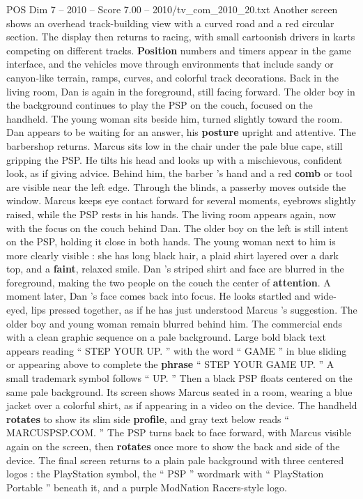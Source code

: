 \begin{textsample}{POS Dim 7 – 2010 – Score 7.00 – 2010/tv\_com\_2010\_20.txt}
Another screen shows an overhead track-building view with a curved road and a red circular section.
The display then returns to racing, with small cartoonish drivers in karts competing on different tracks. \textbf{Position} numbers and timers appear in the game interface, and the vehicles move through environments that include sandy or canyon-like terrain, ramps, curves, and colorful track decorations.
Back in the living room, Dan is again in the foreground, still facing forward.
The older boy in the background continues to play the PSP on the couch, focused on the handheld.
The young woman sits beside him, turned slightly toward the room.
Dan appears to be waiting for an answer, his \textbf{posture} upright and attentive.
The barbershop returns.
Marcus sits low in the chair under the pale blue cape, still gripping the PSP.
He tilts his head and looks up with a mischievous, confident look, as if giving advice.
Behind him, the barber ’s hand and a red \textbf{comb} or tool are visible near the left edge.
Through the blinds, a passerby moves outside the window.
Marcus keeps eye contact forward for several moments, eyebrows slightly raised, while the PSP rests in his hands.
The living room appears again, now with the focus on the couch behind Dan.
The older boy on the left is still intent on the PSP, holding it close in both hands.
The young woman next to him is more clearly visible : she has long black hair, a plaid shirt layered over a dark top, and a \textbf{faint}, relaxed smile.
Dan ’s striped shirt and face are blurred in the foreground, making the two people on the couch the center of \textbf{attention}.
A moment later, Dan ’s face comes back into focus.
He looks startled and wide-eyed, lips pressed together, as if he has just understood Marcus ’s suggestion.
The older boy and young woman remain blurred behind him.
The commercial ends with a clean graphic sequence on a pale background.
Large bold black text appears reading “ STEP YOUR UP. ” with the word “ GAME ” in blue sliding or appearing above to complete the \textbf{phrase} “ STEP YOUR GAME UP. ” A small trademark symbol follows “ UP. ” Then a black PSP floats centered on the same pale background.
Its screen shows Marcus seated in a room, wearing a blue jacket over a colorful shirt, as if appearing in a video on the device.
The handheld \textbf{rotates} to show its slim side \textbf{profile}, and gray text below reads “ MARCUSPSP.COM. ” The PSP turns back to face forward, with Marcus visible again on the screen, then \textbf{rotates} once more to show the back and side of the device.
The final screen returns to a plain pale background with three centered logos : the PlayStation symbol, the “ PSP ” wordmark with “ PlayStation Portable ” beneath it, and a purple ModNation Racers-style logo.

\end{textsample}
